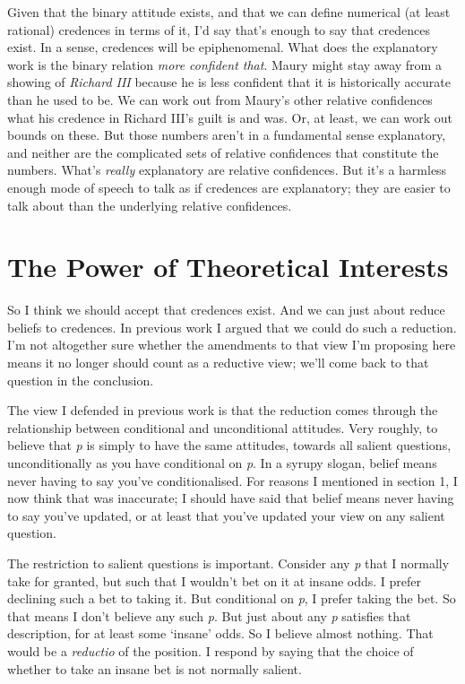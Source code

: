 \documentclass[
  10pt,
  letterpaper,
  DIV=11,
  numbers=noendperiod,
  twoside]{scrartcl}
\begin{document}
Given that the binary attitude exists, and that we can define numerical
(at least rational) credences in terms of it, I'd say that's enough to
say that credences exist. In a sense, credences will be epiphenomenal.
What does the explanatory work is the binary relation \emph{more
confident that}. Maury might stay away from a showing of \emph{Richard
III} because he is less confident that it is historically accurate than
he used to be. We can work out from Maury's other relative confidences
what his credence in Richard III's guilt is and was. Or, at least, we
can work out bounds on these. But those numbers aren't in a fundamental
sense explanatory, and neither are the complicated sets of relative
confidences that constitute the numbers. What's \emph{really}
explanatory are relative confidences. But it's a harmless enough mode of
speech to talk as if credences are explanatory; they are easier to talk
about than the underlying relative confidences.

\section{The Power of Theoretical
Interests}\label{the-power-of-theoretical-interests}

So I think we should accept that credences exist. And we can just about
reduce beliefs to credences. In previous work I argued that we could do
such a reduction. I'm not altogether sure whether the amendments to that
view I'm proposing here means it no longer should count as a reductive
view; we'll come back to that question in the conclusion.

The view I defended in previous work is that the reduction comes through
the relationship between conditional and unconditional attitudes. Very
roughly, to believe that \emph{p} is simply to have the same attitudes,
towards all salient questions, unconditionally as you have conditional
on \emph{p}. In a syrupy slogan, belief means never having to say you've
conditionalised. For reasons I mentioned in section 1, I now think that
was inaccurate; I should have said that belief means never having to say
you've updated, or at least that you've updated your view on any salient
question.

The restriction to salient questions is important. Consider any \emph{p}
that I normally take for granted, but such that I wouldn't bet on it at
insane odds. I prefer declining such a bet to taking it. But conditional
on \emph{p}, I prefer taking the bet. So that means I don't believe any
such \emph{p}. But just about any \emph{p} satisfies that description,
for at least some `insane' odds. So I believe almost nothing. That would
be a \emph{reductio} of the position. I respond by saying that the
choice of whether to take an insane bet is not normally salient.
\end{document}
